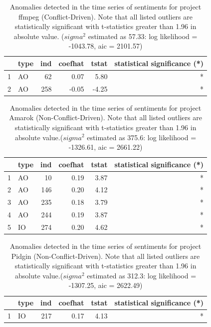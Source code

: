 \documentclass[12pt,letterpaper]{gthesis2}  %
\begin{document}
\begin{table}
\centering
\caption{Anomalies detected in the time series of sentiments for project ffmpeg (Conflict-Driven). Note that all listed outliers are statistically significant with t-statistics greater than 1.96 in absolute value. ($sigma^2$ estimated as 57.33:  log likelihood = -1043.78,  aic = 2101.57)}
\begin{tabular}{rlrrrr}
  \hline
 & type & ind & coefhat & tstat & statistical significance (*)\\ 
  \hline
1 & AO &  62 & 0.07 & 5.80 & * \\ 
  2 & AO & 258 & -0.05 & -4.25 & * \\ 
   \hline
\end{tabular}
\end{table}


\begin{table}
\centering
\caption{Anomalies detected in the time series of sentiments for project Amarok (Non-Conflict-Driven). Note that all listed outliers are statistically significant with t-statistics greater than 1.96 in absolute value.($sigma^2$ estimated as 375.6:  log likelihood = -1326.61,  aic = 2661.22)}
\begin{tabular}{rlrrrr}
  \hline
 & type & ind & coefhat & tstat & statistical significance (*)\\ 
  \hline
1 & AO &  10 & 0.19 & 3.87 & * \\ 
  2 & AO & 146 & 0.20 & 4.12  & *\\ 
  3 & AO & 235 & 0.18 & 3.79 & * \\ 
  4 & AO & 244 & 0.19 & 3.87  & *\\ 
  5 & IO & 274 & 0.20 & 4.62  & *\\ 
   \hline
\end{tabular}
\end{table}


\begin{table}
\centering
\caption{Anomalies detected in the time series of sentiments for project Pidgin (Non-Conflict-Driven). Note that all listed outliers are statistically significant with t-statistics greater than 1.96 in absolute value.($sigma^2$ estimated as 312.3:  log likelihood = -1307.25,  aic = 2622.49)}
\begin{tabular}{rlrrrr}
  \hline
 & type & ind & coefhat & tstat & statistical significance (*)\\ 
  \hline
1 & IO & 217 & 0.17 & 4.13 & * \\ 
   \hline
\end{tabular}
\end{table}
\end{document}
